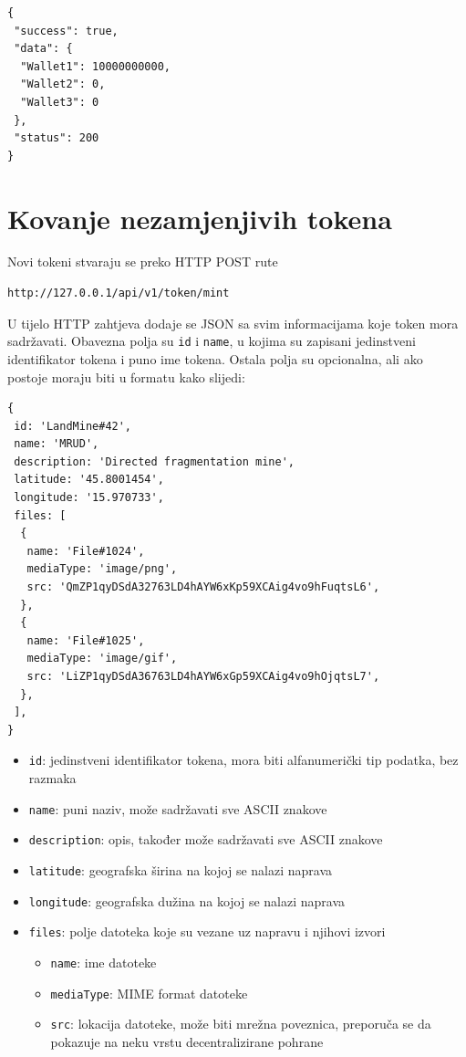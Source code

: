 \documentclass[times, utf8, diplomski]{fer}
\begin{document}
\begin{lstlisting}
{
 "success": true,
 "data": {
  "Wallet1": 10000000000,
  "Wallet2": 0,
  "Wallet3": 0
 },
 "status": 200
}
\end{lstlisting}

\section{Kovanje nezamjenjivih tokena}

Novi tokeni stvaraju se preko HTTP POST rute 

\begin{verbatim}
http://127.0.0.1/api/v1/token/mint
\end{verbatim}

U tijelo HTTP zahtjeva dodaje se JSON sa svim informacijama koje token mora sadržavati. Obavezna polja su \texttt{id} i \texttt{name}, u kojima su zapisani jedinstveni identifikator tokena i puno ime tokena. Ostala polja su opcionalna, ali ako postoje moraju biti u formatu kako slijedi:

\begin{lstlisting}
{
 id: 'LandMine#42',
 name: 'MRUD',
 description: 'Directed fragmentation mine',
 latitude: '45.8001454',
 longitude: '15.970733',
 files: [
  {
   name: 'File#1024',
   mediaType: 'image/png',
   src: 'QmZP1qyDSdA32763LD4hAYW6xKp59XCAig4vo9hFuqtsL6',
  },
  {
   name: 'File#1025',
   mediaType: 'image/gif',
   src: 'LiZP1qyDSdA36763LD4hAYW6xGp59XCAig4vo9hOjqtsL7',
  },
 ],
}
\end{lstlisting}

\begin{itemize}
    \item \texttt{id}: jedinstveni identifikator tokena, mora biti alfanumerički tip podatka, bez razmaka
    \item \texttt{name}: puni naziv, može sadržavati sve ASCII znakove
    \item \texttt{description}: opis, također može sadržavati sve ASCII znakove
    \item \texttt{latitude}: geografska širina na kojoj se nalazi naprava
    \item \texttt{longitude}: geografska dužina na kojoj se nalazi naprava
    \item \texttt{files}: polje datoteka koje su vezane uz napravu i njihovi izvori
    \begin{itemize}
        \item \texttt{name}: ime datoteke
        \item \texttt{mediaType}: MIME format datoteke
        \item \texttt{src}: lokacija datoteke, može biti mrežna poveznica, preporuča se da pokazuje na neku vrstu decentralizirane pohrane
    \end{itemize}
\end{itemize}
\end{document}
